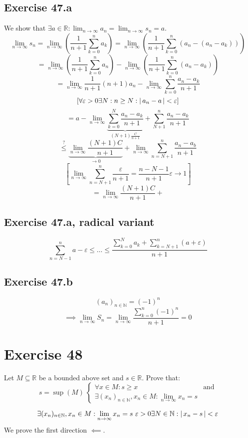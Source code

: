 \documentclass[a4paper]{article}
\theoremstyle{definition}
\newcommand\abs[1]{\left|\thinspace #1\thinspace\right|}
\begin{document}
\subsection{Exercise 47.a}
%
We show that $\exists a \in \mathbb R: \lim_{n\to\infty} a_n = \lim_{n\to\infty} s_n = a$.
%
\[
  \lim_{n\to\infty} s_n
  = \lim_{n\to\infty} \left(\frac{1}{n+1} \sum_{k=0}^n a_k\right)
  = \lim_{n\to\infty} \left(\frac1{n+1} \sum_{k=0}^n \left(a_n - (a_n - a_k)\right)\right)
\] \[
  = \lim_{n\to\infty} \left(\frac{1}{n+1} \sum_{k=0}^n a_n\right)
  - \lim_{n\to\infty} \left(\frac{1}{n+1} \sum_{k=0}^n (a_n - a_k)\right)
\] \[
  = \lim_{n\to\infty} \frac{1}{n+1} (n+1) a_n
  - \lim_{n\to\infty} \sum_{k=0}^n \frac{a_n - a_k}{n+1}
\] \[
  \left[\forall \varepsilon > 0 \exists N: n \geq N: \abs{a_n - a} < \varepsilon\right]
\] \[
  = a - \lim_{n\to\infty} \underbrace{\sum_{k=0}^{N} \frac{a_n - a_k}{n+1}}_{(N + 1) \frac{C}{n+1}} + \sum_{N+1}^n \frac{a_n - a_k}{n+1}
\] \[
  \stackrel{?}{\leq} \underbrace{\lim_{n\to\infty} \frac{(N + 1) C}{n+1}}_{\to 0}
  + \lim_{n\to\infty} \sum_{n=N+1}^n \frac{a_n - a_b}{n+1}
\] \[
  \left[\lim_{n\to\infty} \sum_{n=N+1}^n \frac{\varepsilon}{n+1} = \frac{n - N - 1}{n+1} \varepsilon \to 1\right]
\] \[
  = \lim_{n\to\infty} \frac{(N + 1) C}{n+1} +
\]

\subsection{Exercise 47.a, radical variant}
\[
  \sum_{n=N-1}^n a-\varepsilon \leq \dots \leq \frac{\sum_{k=0}^N a_k + \sum_{k=N+1}^n (a + \varepsilon)}{n+1}
\]

\subsection{Exercise 47.b}
\[ (a_n)_{n \in \mathbb N} = (-1)^n \]
\[ \implies \lim_{n\to\infty} S_n = \lim_{n\to\infty} \frac{\sum_{k=0}^n (-1)^n}{n+1} = 0 \]

\section{Exercise 48}
\begin{ex}
  Let $M \subseteq \mathbb R$ be a bounded above set and $s \in \mathbb R$.
  Prove that:
  \[
      s = \sup(M) \
      \left\{\begin{array}{ll}
        \forall x \in M: s \geq x & \text{and} \\
        \exists (x_n)_{n \in \mathbb N}, x_n \in M: \lim_{n\to\infty} x_n = s &
      \end{array}\right.
  \]
\end{ex}
\[
  \exists (x_n)_{n \in \mathbb N}, x_n \in M: \lim_{n\to\infty} x_n = s
  \ \varepsilon > 0 \exists N \in \mathbb N: \abs{x_n - s} < \varepsilon
\]
We prove the first direction $\impliedby$.
\end{document}
